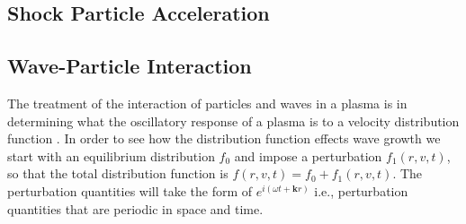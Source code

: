 \subsection{Shock Particle Acceleration}\label{sec:30}

\subsection{Wave-Particle Interaction}\label{sec:31}


The treatment of the interaction of particles and waves in a plasma is in determining what the oscillatory response of a plasma is to a velocity distribution function \citep{inan2011}. In order to see how the distribution function effects wave growth we start with an equilibrium distribution $f_0$ and impose a perturbation $f_1(r,v,t)$, so that the total distribution function is $f(r,v,t) = f_0 +f_1(r,v,t)$.  The perturbation quantities will take the form of $e^{i(\omega t + \mathbf{k}r)}$ i.e., perturbation quantities that are periodic in space and time.

